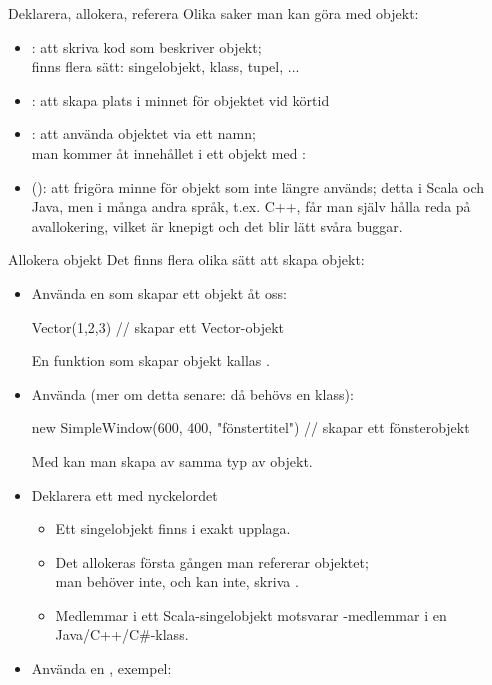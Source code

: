 \begin{Slide}{Deklarera, allokera, referera}
Olika saker man kan göra med objekt:
\begin{itemize}
  \item {}: att skriva kod som beskriver objekt; \\
  finns flera sätt: singelobjekt, klass, tupel, ...
  \item {}: att skapa plats i minnet för objektet vid körtid
  \item {}: att använda objektet via ett namn;\\
  man kommer åt innehållet i ett objekt med : \\
  \pause
  \item (): att frigöra minne för objekt som inte längre används;
  detta  i Scala och Java, men i många andra språk,
  t.ex. C++, får man själv hålla reda på avallokering,
  vilket är knepigt och det blir lätt svåra buggar.
\end{itemize}
\end{Slide}


\begin{Slide}{Allokera objekt}\SlideFontSmall
Det finns flera olika sätt att skapa objekt:
\begin{itemize}

\item Använda en  som skapar ett objekt åt oss:
\begin{Code}
Vector(1,2,3)   // skapar ett Vector-objekt
\end{Code}
{\SlideFontSmall En funktion som skapar objekt kallas .\vspace{0.5em}}

\item Använda  (mer om detta senare: då behövs en klass):
\begin{Code}
new SimpleWindow(600, 400, "fönstertitel")  // skapar ett fönsterobjekt
\end{Code}
{\SlideFontSmall Med  kan man skapa  av samma typ av objekt.\vspace{0.5em}}

\item Deklarera ett  med nyckelordet 
\begin{itemize}\SlideFontSmall
  \item Ett singelobjekt finns i exakt  upplaga.
  \item Det allokeras  första gången man refererar objektet; \\
  man behöver inte, och kan inte, skriva .
  \pause
  \item Medlemmar i ett Scala-singelobjekt motsvarar -medlemmar i en Java/C++/C\#-klass.
\end{itemize}
\item Använda en , exempel: 
\end{itemize}
\end{Slide}

